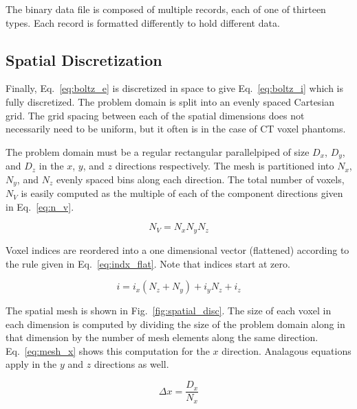 The binary data file is composed of multiple records, each of one of thirteen types. Each record is formatted differently to hold different data.

\subsection{Spatial Discretization}

Finally, Eq.~\ref{eq:boltz_e} is discretized in space to give Eq.~\ref{eq:boltz_i} which is fully discretized. The problem domain is split into an evenly spaced Cartesian grid. The grid spacing between each of the spatial dimensions does not necessarily need to be uniform, but it often is in the case of CT voxel phantoms.

The problem domain must be a regular rectangular parallelpiped of size $D_x$, $D_y$, and $D_z$ in the $x$, $y$, and $z$ directions respectively. The mesh is partitioned into $N_x$, $N_y$, and $N_z$ evenly spaced bins along each direction. The total number of voxels, $N_V$ is easily computed as the multiple of each of the component directions given in Eq.~\ref{eq:n_v}.

\begin{equation} \label{eq:n_v}
	N_V = N_x N_y N_z
\end{equation}

Voxel indices are reordered into a one dimensional vector (flattened) according to the rule given in Eq.~\ref{eq:indx_flat}. Note that indices start at zero.

\begin{equation} \label{eq:indx_flat}
	i = i_x (N_z + N_y) + i_y N_z + i_z
\end{equation}

The spatial mesh is shown in Fig.~\ref{fig:spatial_disc}. The size of each voxel in each dimension is computed by dividing the size of the problem domain along in that dimension by the number of mesh elements along the same direction. Eq.~\ref{eq:mesh_x} shows this computation for the $x$ direction. Analagous equations apply in the $y$ and $z$ directions as well.

\begin{equation} \label{eq:mesh_x}
\Delta x = \frac{D_x}{N_x}
\end{equation}

